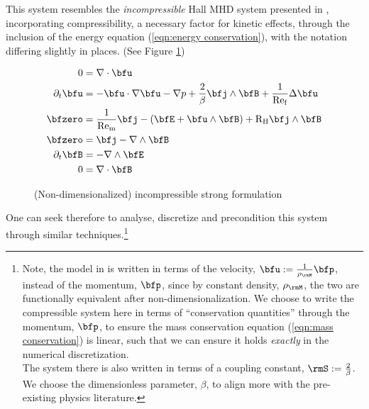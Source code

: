     This system resembles the \emph{incompressible} Hall MHD system presented in \cite{LHF22}, incorporating compressibility, a necessary factor for kinetic effects, through the inclusion of the energy equation (\ref{eqn:energy conservation}), with the notation differing slightly in places. (See Figure \ref{fig:incompressible strong form})

    \begin{figure}
        \centering
        \line
        \begin{align}
            0  &=  \nabla\cdot\bfu  \label{eqn:incompressible mass conservation}  \\
            \partial_{t}\bfu  &=  - \bfu\cdot\nabla\bfu - \nabla p + \frac{2}{\beta}\bfj\wedge\bfB + \frac{1}{\rmRef}\Delta\bfu  \label{eqn:incompressible momentum conservation}  \\
            \bfzero  &=  \frac{1}{\rmRem}\bfj - \left(\bfE + \bfu\wedge\bfB\right) + \rmRH\bfj\wedge\bfB  \label{eqn:incompressible current identity}  \\
            \bfzero  &=  \bfj - \nabla\wedge\bfB  \label{eqn:incompressible Ampère's law}  \\
            \partial_{t}\bfB  &=  - \nabla\wedge\bfE  \label{eqn:incompressible Faraday's law}  \\
            0  &=  \nabla\cdot\bfB  \label{eqn:incompressible Gauss's law}
        \end{align}
        \line
        \caption{(Non-dimensionalized) incompressible strong formulation}
        \label{fig:incompressible strong form}
    \end{figure}

    One can seek therefore to analyse, discretize and precondition this system through similar techniques.\footnote{Note, the model in \cite{LHF22} is written in terms of the velocity, $\bfu  :=  \frac{1}{\rho_{\rmM}}\bfp$, instead of the momentum, $\bfp$, since by constant density, $\rho_{\rmM}$, the two are functionally equivalent after non-dimensionalization. We choose to write the compressible system here in terms of ``conservation quantities'' through the momentum, $\bfp$, to ensure the mass conservation equation (\ref{eqn:mass conservation}) is linear, such that we can ensure it holds \emph{exactly} in the numerical discretization. \\ The system there is also written in terms of a coupling constant, $\rmS  :=  \frac{2}{\beta}$. We choose the dimensionless parameter, $\beta$, to align more with the pre-existing physics literature. \BA{([Ref])}}
    
